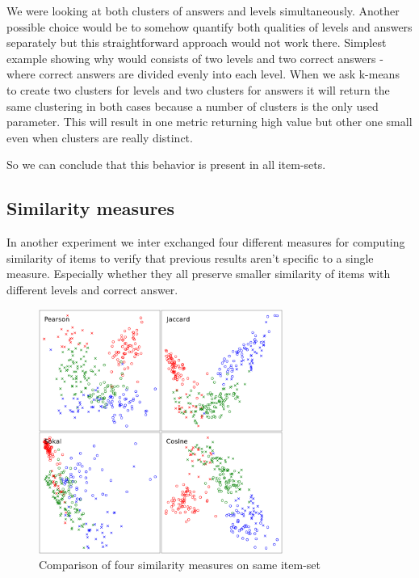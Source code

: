 \documentclass[
  digital, %
  table,   %
  nolof,     %
  nolot,     %
  nocover,
  color
]{fithesis3}
\begin{document}

We were looking at both clusters of answers and levels simultaneously. Another possible choice would be to somehow quantify both qualities of levels and answers separately but this straightforward approach would not work there. Simplest example showing why would consists of two levels and two correct answers - where correct answers are divided evenly into each level. When we ask k-means to create two clusters for levels and two clusters for answers it will return the same clustering in both cases because a number of clusters is the only used parameter. This will result in one metric returning high value but other one small even when clusters are really distinct.


So we can conclude that this behavior is present in all item-sets.


\subsection{Similarity measures}\label{similarity-measures}

In another experiment we inter exchanged four different measures for computing similarity of items to verify that previous results aren't specific to a single measure. Especially whether they all preserve smaller similarity of items with different levels and correct answer.

\begin{figure}
  \includegraphics[height=8cm]{img/measures}
  \caption{Comparison of four similarity measures on same item-set}
  \label{fig:measures}
\end{figure}
\end{document}
